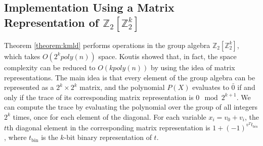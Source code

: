 

\subsection{Implementation Using a Matrix Representation of $\mathbb{Z}_2[\mathbb{Z}_2^k]$}
Theorem \ref{theorem:kmld} performs operations in the group algebra $\mathbb{Z}_2[\mathbb{Z}_2^k]$,
which takes $O(2^k poly(n))$ space. Koutis \cite{koutis:icalp08} showed that, in fact, the space complexity can be reduced to $O(k poly(n))$ by using the idea of matrix representations.
%
The main idea is that every element of the group algebra can be represented as a $2^{k}\times2^k$ matrix, and the polynomial $P(X)$ evaluates to $\bar 0$ if and only if the trace of its corresponding matrix representation is $0 \mod 2^{k+1}$. We can compute the trace by evaluating the polynomial over the group of all integers $2^k$ times, once for each element of the diagonal. For each variable $x_i = v_0 + v_i$, the $t$th diagonal element in the corresponding matrix representation is $1+(-1)^{v^T t_{bin}}$, where $t_{\text{bin}}$ is the $k$-bit binary representation of $t$.

